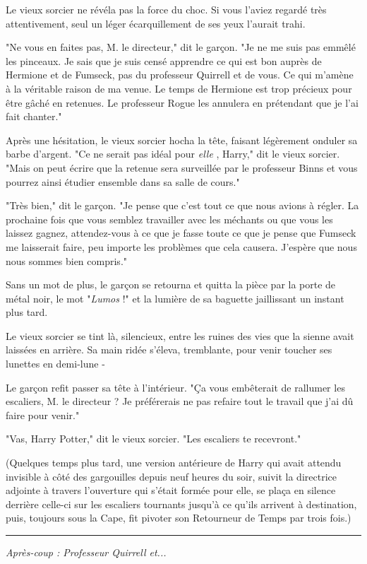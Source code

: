 Le vieux sorcier ne révéla pas la force du choc. Si vous l'aviez regardé très attentivement, seul un léger écarquillement de ses yeux l'aurait trahi.

"Ne vous en faites pas, M. le directeur," dit le garçon. "Je ne me suis pas emmêlé les pinceaux. Je sais que je suis censé apprendre ce qui est bon auprès de Hermione et de Fumseck, pas du professeur Quirrell et de vous. Ce qui m'amène à la véritable raison de ma venue. Le temps de Hermione est trop précieux pour être gâché en retenues. Le professeur Rogue les annulera en prétendant que je l'ai fait chanter."

Après une hésitation, le vieux sorcier hocha la tête, faisant légèrement onduler sa barbe d'argent. "Ce ne serait pas idéal pour \emph{elle} , Harry," dit le vieux sorcier. "Mais on peut écrire que la retenue sera surveillée par le professeur Binns et vous pourrez ainsi étudier ensemble dans sa salle de cours."

"Très bien," dit le garçon. "Je pense que c'est tout ce que nous avions à régler. La prochaine fois que vous semblez travailler avec les méchants ou que vous les laissez gagnez, attendez-vous à ce que je fasse toute ce que je pense que Fumseck me laisserait faire, peu importe les problèmes que cela causera. J'espère que nous nous sommes bien compris."

Sans un mot de plus, le garçon se retourna et quitta la pièce par la porte de métal noir, le mot "\emph{Lumos}  !" et la lumière de sa baguette jaillissant un instant plus tard.

Le vieux sorcier se tint là, silencieux, entre les ruines des vies que la sienne avait laissées en arrière. Sa main ridée s'éleva, tremblante, pour venir toucher ses lunettes en demi-lune -

Le garçon refit passer sa tête à l'intérieur. "Ça vous embêterait de rallumer les escaliers, M. le directeur ? Je préférerais ne pas refaire tout le travail que j'ai dû faire pour venir."

"Vas, Harry Potter," dit le vieux sorcier. "Les escaliers te recevront."

(Quelques temps plus tard, une version antérieure de Harry qui avait attendu invisible à côté des gargouilles depuis neuf heures du soir, suivit la directrice adjointe à travers l'ouverture qui s'était formée pour elle, se plaça en silence derrière celle-ci sur les escaliers tournants jusqu'à ce qu'ils arrivent à destination, puis, toujours sous la Cape, fit pivoter son Retourneur de Temps par trois fois.)
\par\noindent\rule{\textwidth}{0.4pt}
\emph{Après-coup : Professeur Quirrell et...} 

